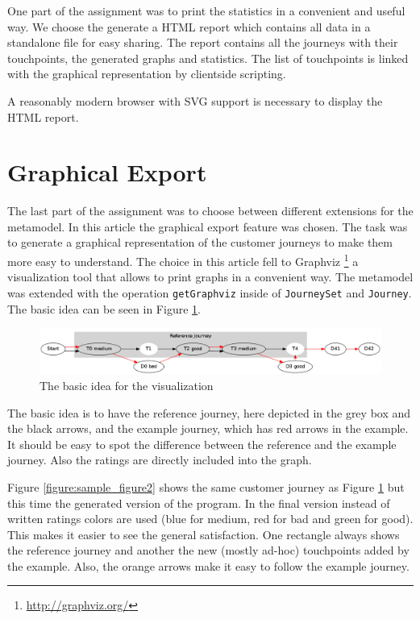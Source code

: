 \documentclass[12pt]{scrartcl}
\begin{document}
One part of the assignment was to print the statistics in a convenient and useful way.
We choose the generate a HTML report which contains all data in a standalone file for easy sharing. The report
contains all the journeys with their touchpoints, the generated graphs and statistics. The list of touchpoints
is linked with the graphical representation by clientside scripting.

A reasonably modern browser with SVG support is necessary to display the HTML report.

\section{Graphical Export} 
\label{section:export}

The last part of the assignment was to choose between different extensions for the metamodel. In this article
the graphical export feature was chosen. The task was to generate a graphical representation of the customer
journeys to make them more easy to understand. The choice in this article fell to Graphviz 
\footnote{\url{http://graphviz.org/}} a visualization tool that allows to print graphs in a convenient way.
The metamodel was extended with the operation \lstinline!getGraphviz! inside of \lstinline!JourneySet! and
\lstinline!Journey!. The basic idea can be seen in Figure \ref{figure:sample_figure}.

\begin{figure}[hbtp]
	\centering
	\includegraphics[scale=0.35]{img/sample_journey1.png}
	\caption{The basic idea for the visualization}
	\label{figure:sample_figure}
\end{figure}

The basic idea is to have the reference journey, here depicted in the grey box and the black arrows, and the 
example journey, which has red arrows in the example. It should be easy to spot the difference between the
reference and the example journey. Also the ratings are directly included into the graph.

Figure \ref{figure:sample_figure2} shows the same customer journey as Figure \ref{figure:sample_figure} but this
time the generated version of the program. In the final version instead of written ratings colors are used (blue for
medium, red for bad and green for good). This makes it easier to see the general satisfaction. One rectangle always
shows the reference journey and another the new (mostly ad-hoc) touchpoints added by the example. Also, the orange
arrows make it easy to follow the example journey.
\end{document}
